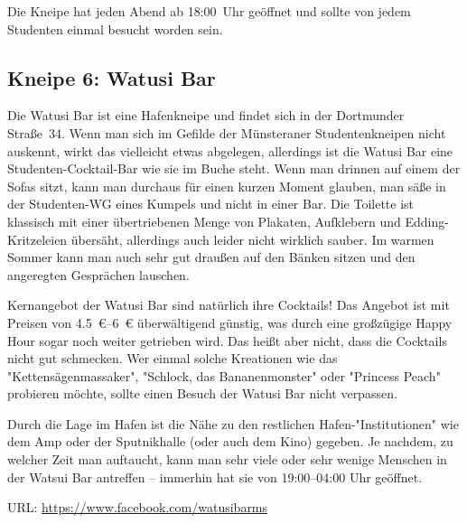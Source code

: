 \begin{multicols*}{2}
Die Kneipe hat jeden Abend ab 18:00~Uhr geöffnet und sollte von jedem Studenten
einmal besucht worden sein.

\begin{center}
\end{center}

\subsection*{Kneipe 6: Watusi Bar}
Die Watusi Bar ist eine Hafenkneipe und findet sich in der Dortmunder Straße~34.
Wenn man sich im Gefilde der Münsteraner Studentenkneipen nicht auskennt, wirkt das vielleicht etwas abgelegen, allerdings ist die Watusi Bar eine Studenten-Cocktail-Bar wie sie im Buche steht.
Wenn man drinnen auf einem der Sofas sitzt, kann man durchaus für einen kurzen Moment glauben, man säße in der Studenten-WG eines Kumpels und nicht in einer Bar.
Die Toilette ist klassisch mit einer übertriebenen Menge von Plakaten, Aufklebern und Edding-Kritzeleien übersäht, allerdings auch leider nicht wirklich sauber.
Im warmen Sommer kann man auch sehr gut draußen auf den Bänken sitzen und den angeregten Gesprächen lauschen.

Kernangebot der Watusi Bar sind natürlich ihre Cocktails!
Das Angebot ist mit Preisen von \SIrange{4,5}{6}{\euro} überwältigend günstig, was durch eine großzügige Happy Hour sogar noch weiter getrieben wird.
Das heißt aber nicht, dass die Cocktails nicht gut schmecken.
Wer einmal solche Kreationen wie das "Kettensägenmassaker", "Schlock, das Bananenmonster" oder "Princess Peach" probieren möchte, sollte einen Besuch der Watusi Bar nicht verpassen.

Durch die Lage im Hafen ist die Nähe zu den restlichen Hafen-"Institutionen" wie dem Amp oder der Sputnikhalle (oder auch dem Kino) gegeben.
Je nachdem, zu welcher Zeit man auftaucht, kann man sehr viele oder sehr wenige Menschen in der Watsui Bar antreffen – immerhin hat sie von 19:00–04:00 Uhr geöffnet.

URL: \url{https://www.facebook.com/watusibarms}

\begin{center}
\end{center}



\end{multicols*}
